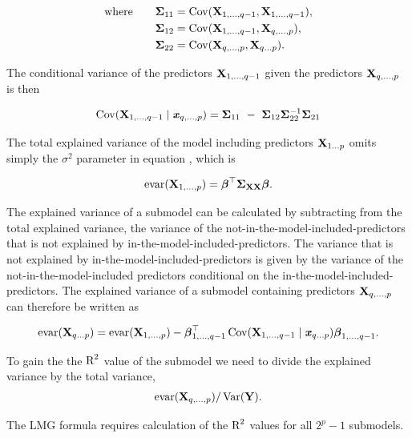 \documentclass[11pt,a4paper,twoside]{book}\usepackage[]{graphicx}\usepackage[]{color}
\begin{document}
         \begin{align*} 
   \text{where} \qquad {\boldsymbol{\Sigma}}{}_{11} &= \operatorname{Cov}({\mathbf{X}}_{1,\dotsc, q-1}, {\mathbf{X}}_{1 ,\dotsc,q-1}), \\ {\boldsymbol{\Sigma}}{}_{12} &= \operatorname{Cov}({\mathbf{X}}_{1,\dotsc, q-1}, {\mathbf{X}}_{q ,\dotsc, p}),\\ {\boldsymbol{\Sigma}}{}_{22} &= \operatorname{Cov}({\mathbf{X}}_{q ,\dotsc, p}, {\mathbf{X}}_{q \dots p}) \text{.} \nonumber
      \end{align*}
      
 The conditional variance of the predictors $ {\mathbf{X}}_{1 ,\dotsc, q-1} $ given the predictors  $ {\mathbf{X}}_{q ,\dotsc, p} $ is then
 
          \begin{align*} 
 \cov(\X_{1,\dotsc, q-1} \mid \x_{q ,\dotsc, p}) = \bSigma_{11}\ -\ \bSigma_{12} \bSigma_{22}^{-1}\bSigma_{21} 
       \end{align*}
       
       The total explained variance of the model including predictors ${\mathbf{X}}_{1 \dots p}$ omits simply the $\sigma^2$ parameter in equation , which is

      \begin{align*} 
        \text{evar}({\mathbf{X}}_{1 ,\dotsc, p}) = {\boldsymbol{\beta}}^\top {\boldsymbol{\Sigma}}{}_{{\mathbf{X}} {\mathbf{X}}}  {\boldsymbol{\beta}}. 
   \end{align*}

The explained variance of a submodel can be calculated by subtracting from the total explained variance, the variance of the not-in-the-model-included-predictors that is not explained by in-the-model-included-predictors. The variance that is not explained by in-the-model-included-predictors is given by the variance of the not-in-the-model-included predictors conditional on the in-the-model-included-predictors. The explained variance of a submodel containing predictors ${\mathbf{X}}_{q ,\dotsc, p}$ can therefore be written as

       \begin{align} 
       \text{evar}({\mathbf{X}}_{q \dots p}) =  \text{evar}({\mathbf{X}}_{1  ,\dotsc, p}) - {\boldsymbol{\beta}}^\top_{1 ,\dotsc, q-1} \operatorname{Cov}({\mathbf{X}}_{1,\dotsc, {q-1}} \mid {\textbf{\textit{x}}}_{q \dots p}) {\boldsymbol{\beta}}_{1 ,\dotsc, {q-1}}.
   \end{align}

To gain the the $\text{R}^2$ value of the submodel we need to divide the explained variance by the total variance,
       \begin{align} 
\text{evar}({\mathbf{X}}_{q ,\dotsc, p}) / \operatorname{Var}({\mathbf{Y}}).   
\end{align}

The LMG formula requires calculation of the $\text{R}^2$ values for all $2^p-1$ submodels. 
\end{document}
